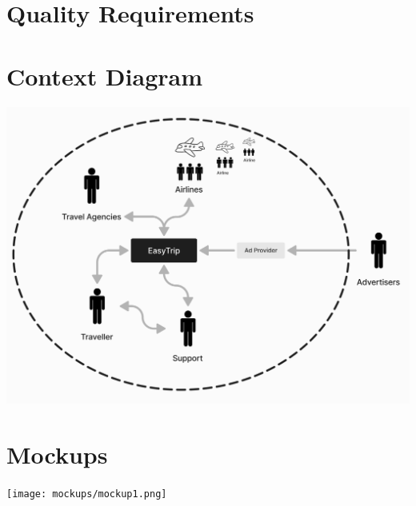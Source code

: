 \documentclass[a4paper]{article}
\begin{document}
\section{Quality Requirements}


\section{Context Diagram}
\includegraphics[width=.99\textwidth]{resources/contextDiagram.png}

\section{Mockups}
\texttt{[image: mockups/mockup1.png]}
\end{document}

